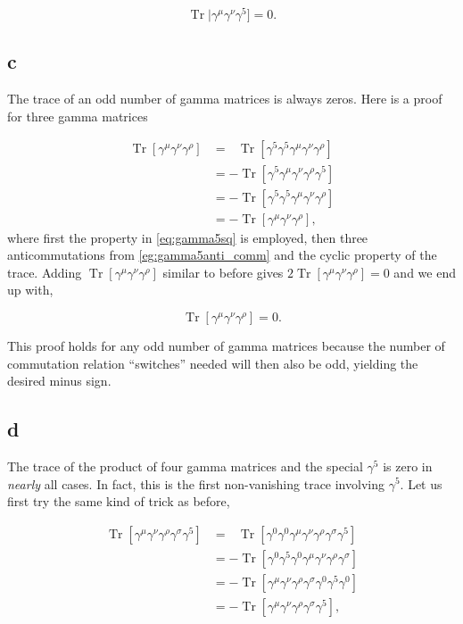 \documentclass[11pt, a4paper]{amsart}
\DeclareMathOperator{\Tr}{Tr}
\begin{document}
\begin{equation}
\Tr|\gamma^\mu\gamma^\nu\gamma^5] = 0.
\end{equation}

\subsection*{c}

The trace of an odd number of gamma matrices is always zeros. Here is a proof for three gamma matrices

\begin{align}
\Tr[\gamma^\mu\gamma^\nu\gamma^\rho] 
  &=\ \ \ \Tr[\gamma^5\gamma^5\gamma^\mu\gamma^\nu\gamma^\rho] \\
  &= -\Tr[\gamma^5\gamma^\mu\gamma^\nu\gamma^\rho\gamma^5] \\
  &= -\Tr[\gamma^5\gamma^5\gamma^\mu\gamma^\nu\gamma^\rho] \\
  &= -\Tr[\gamma^\mu\gamma^\nu\gamma^\rho],
\end{align}
where first the property in \autoref{eq:gamma5sq} is employed, then three anticommutations from \autoref{eg:gamma5anti_comm} and the cyclic property of the trace. Adding $\Tr[\gamma^\mu\gamma^\nu\gamma^\rho]$ similar to before gives $2\Tr[\gamma^\mu\gamma^\nu\gamma^\rho] = 0$ and we end up with,

\begin{equation}
\Tr[\gamma^\mu\gamma^\nu\gamma^\rho] = 0.
\end{equation}

This proof holds for any odd number of gamma matrices because the number of commutation relation ``switches'' needed will then also be odd, yielding the desired minus sign.

\subsection*{d}

The trace of the product of four gamma matrices and the special $\gamma^5$ is zero in \emph{nearly} all cases. In fact, this is the first non-vanishing trace involving $\gamma^5$. Let us first try the same kind of trick as before,

\begin{align}
\Tr[\gamma^\mu\gamma^\nu\gamma^\rho\gamma^\sigma\gamma^5] 
   &= \ \ \ \Tr[\gamma^0\gamma^0\gamma^\mu\gamma^\nu\gamma^\rho\gamma^\sigma\gamma^5] \\
   &= -\Tr[\gamma^0\gamma^5\gamma^0\gamma^\mu\gamma^\nu\gamma^\rho\gamma^\sigma] \\
   &= -\Tr[\gamma^\mu\gamma^\nu\gamma^\rho\gamma^\sigma\gamma^0\gamma^5\gamma^0] \\
   &= -\Tr[\gamma^\mu\gamma^\nu\gamma^\rho\gamma^\sigma\gamma^5],
\end{align}
\end{document}
